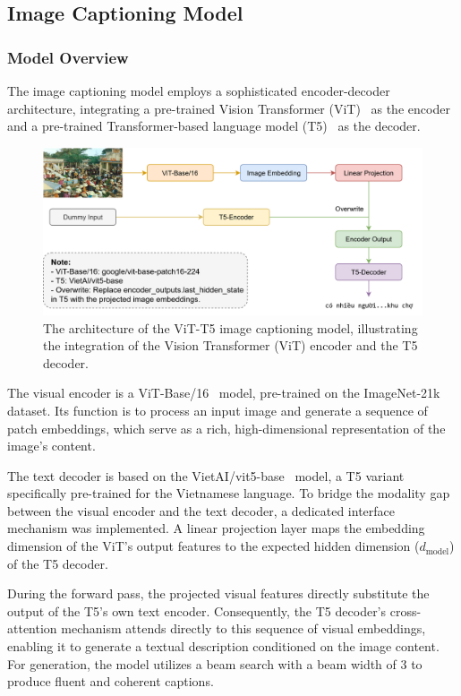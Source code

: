 \subsection{Image Captioning Model}

\subsubsection{Model Overview}
The image captioning model employs a sophisticated encoder-decoder architecture, integrating a pre-trained Vision Transformer (ViT)~\cite{dosovitskiy2020image} as the encoder and a pre-trained Transformer-based language model (T5)~\cite{google2020t5} as the decoder.

\begin{figure}
  \centering
  \includegraphics[width=\textwidth]{image/img-captioning-archi.png}
  \caption{The architecture of the ViT-T5 image captioning model, illustrating the integration of the Vision Transformer (ViT) encoder and the T5 decoder.}
  \label{fig:img_cap_archi}
\end{figure}


The visual encoder is a ViT-Base/16~\cite{google-vit-base-patch16-224} model, pre-trained on the ImageNet-21k dataset. Its function is to process an input image and generate a sequence of patch embeddings, which serve as a rich, high-dimensional representation of the image's content.

The text decoder is based on the VietAI/vit5-base~\cite{phan-etal-2022-vit5} model, a T5 variant specifically pre-trained for the Vietnamese language. To bridge the modality gap between the visual encoder and the text decoder, a dedicated interface mechanism was implemented. A linear projection layer maps the embedding dimension of the ViT's output features to the expected hidden dimension ($d_{\text{model}}$) of the T5 decoder.

During the forward pass, the projected visual features directly substitute the output of the T5's own text encoder. Consequently, the T5 decoder's cross-attention mechanism attends directly to this sequence of visual embeddings, enabling it to generate a textual description conditioned on the image content. For generation, the model utilizes a beam search with a beam width of 3 to produce fluent and coherent captions.

